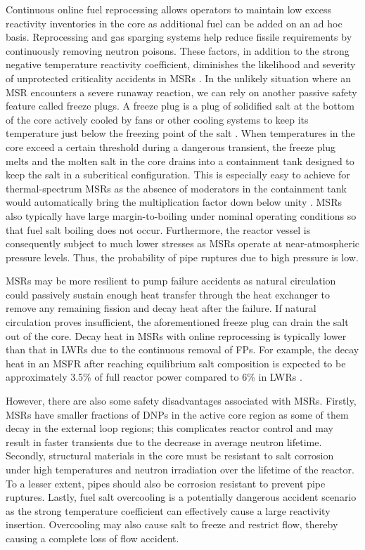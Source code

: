 Continuous online fuel reprocessing allows operators to maintain low excess
reactivity inventories in the core as additional fuel can be added on an ad
hoc basis. Reprocessing and gas sparging systems help reduce fissile
requirements by continuously removing neutron poisons. These factors, in
addition to the strong negative temperature
reactivity coefficient, diminishes the likelihood and severity of unprotected
criticality accidents in \glspl{MSR} \cite{elsheikh_safety_2013}. In the
unlikely situation where an \gls{MSR} encounters a severe runaway reaction,
we can rely on another passive safety feature called freeze plugs. A freeze
plug is a plug of solidified salt at the bottom of the core actively cooled by
fans or other cooling systems to keep its temperature just below the freezing
point of the salt \cite{aji_experimental_2020}. When temperatures in the core
exceed a certain threshold during a dangerous transient, the freeze plug melts
and the molten salt in the core drains into a containment tank designed to
keep the salt in a subcritical configuration. This is especially easy to
achieve for
thermal-spectrum \glspl{MSR} as the absence of moderators in the containment
tank would automatically bring the multiplication factor down below unity
\cite{elsheikh_safety_2013}. \glspl{MSR} also typically have large
margin-to-boiling under nominal operating conditions so that fuel salt boiling
does not occur. Furthermore, the reactor vessel is consequently subject to
much lower stresses as \glspl{MSR} operate at near-atmospheric pressure
levels. Thus, the probability of pipe ruptures due to high pressure is low.

\glspl{MSR} may be more resilient to pump failure accidents as natural
circulation could passively sustain enough heat transfer through the heat
exchanger to remove any remaining fission and decay heat after the failure. If
natural circulation proves insufficient, the aforementioned freeze plug can
drain the salt out of the core. Decay heat in \glspl{MSR} with online
reprocessing is typically lower than that in \glspl{LWR} due to the
continuous removal of \glspl{FP}. For example, the decay heat in an \gls{MSFR}
after reaching equilibrium salt composition is expected to be approximately
3.5\% of full reactor power compared to 6\% in \glspl{LWR}
\cite{brovchenko_design-related_2013}.

However, there are also some safety disadvantages associated with \glspl{MSR}.
Firstly, \glspl{MSR} have smaller fractions of \glspl{DNP} in the active core
region as some of them decay in the external loop regions; this complicates
reactor control and may result in faster transients due to the decrease in
average neutron lifetime. Secondly, structural materials in the core must be
resistant to salt corrosion under high temperatures and neutron irradiation
over the lifetime of the reactor. To a lesser extent, pipes should also be
corrosion resistant to prevent pipe ruptures. Lastly, fuel salt overcooling is
a potentially dangerous accident scenario as the strong temperature
coefficient can effectively cause a large reactivity insertion. Overcooling
may also cause salt to freeze and restrict flow, thereby causing a complete
loss of flow accident.

